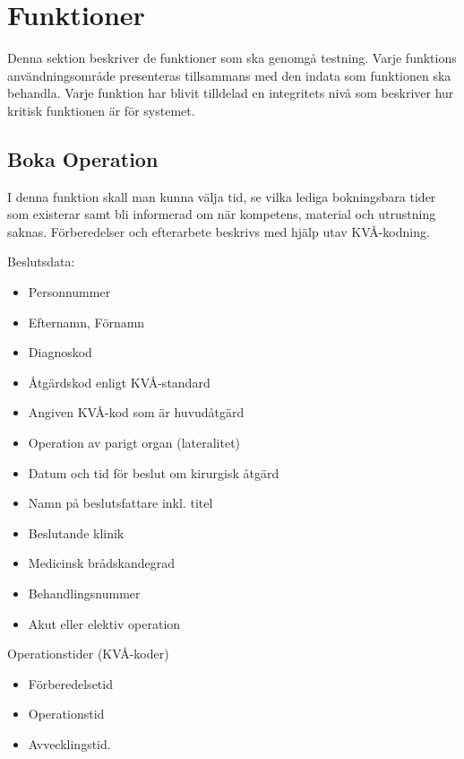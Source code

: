 \documentclass[a4paper,10pt]{article}
\begin{document}
\section{Funktioner}
Denna sektion beskriver de funktioner som ska genomgå testning. Varje funktions användningsområde presenteras tillsammans med den indata som funktionen ska behandla. Varje funktion har blivit tilldelad en integritets nivå som beskriver hur kritisk funktionen är för systemet.
    \subsection{Boka Operation}

I denna funktion skall man kunna välja tid, se vilka lediga bokningsbara tider som existerar samt bli informerad om när kompetens, material och utrustning saknas. Förberedelser och efterarbete beskrivs med hjälp utav KVÅ-kodning.

Beslutsdata:
\begin{multicols}{2}
\begin{itemize}
	\item Personnummer
	\item Efternamn, Förnamn
	\item Diagnoskod
	\item Åtgärdskod enligt KVÅ-standard
	\item Angiven KVÅ-kod som är huvudåtgärd
	\item Operation av parigt organ (lateralitet)
	\item Datum och tid för beslut om kirurgisk åtgärd
	\item Namn på beslutsfattare inkl. titel
	\item Beslutande klinik
	\item Medicinsk brådskandegrad
	\item Behandlingsnummer
	\item Akut eller elektiv operation
\end{itemize}
\end{multicols}

Operationstider (KVÅ-koder)
\begin{multicols}{3}
\begin{itemize}
	\item Förberedelsetid
	\item Operationstid
	\item Avvecklingstid.
\end{itemize}
\end{multicols}
\end{document}
